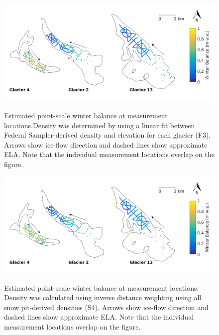 \documentclass{sfuthesis}
\begin{document}
\begin{figure}[H]
	\centering
	\includegraphics[width = \textwidth]{SWEmap_opt7.png}\\
	\caption{Estimated point-scale winter balance at measurement locations.Density was determined by using a linear fit between Federal Sampler-derived density and elevation for each glacier (F3). Arrows show ice-flow direction and dashed lines show approximate ELA. Note that the individual measurement locations overlap on the figure.}
	\label{fig:SWEmap_F3}
\end{figure}

\begin{figure}[H]
	\centering
	\includegraphics[width = \textwidth]{SWEmap_opt8.png}\\
	\caption{Estimated point-scale winter balance at measurement locations. Density was calculated using inverse distance weighting using all snow pit-derived densities (S4). Arrows show ice-flow direction and dashed lines show approximate ELA. Note that the individual measurement locations overlap on the figure.}
	\label{fig:SWEmap_S4}
\end{figure}
\end{document}
